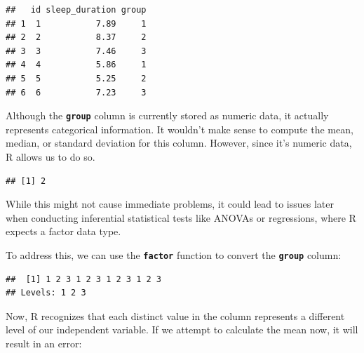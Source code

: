 \documentclass[
]{book}
\newenvironment{Shaded}{\begin{snugshade}}{\end{snugshade}}
\newcommand{\FunctionTok}[1]{\textcolor[rgb]{0.13,0.29,0.53}{\textbf{#1}}}
\newcommand{\NormalTok}[1]{#1}
\newcommand{\SpecialCharTok}[1]{\textcolor[rgb]{0.81,0.36,0.00}{\textbf{#1}}}
\begin{document}
\begin{verbatim}
##   id sleep_duration group
## 1  1           7.89     1
## 2  2           8.37     2
## 3  3           7.46     3
## 4  4           5.86     1
## 5  5           5.25     2
## 6  6           7.23     3
\end{verbatim}

Although the \textbf{\texttt{group}} column is currently stored as numeric data, it actually represents categorical information. It wouldn't make sense to compute the mean, median, or standard deviation for this column. However, since it's numeric data, R allows us to do so.

\begin{Shaded}
\end{Shaded}

\begin{verbatim}
## [1] 2
\end{verbatim}

While this might not cause immediate problems, it could lead to issues later when conducting inferential statistical tests like ANOVAs or regressions, where R expects a factor data type.

To address this, we can use the \textbf{\texttt{factor}} function to convert the \textbf{\texttt{group}} column:

\begin{Shaded}
\end{Shaded}

\begin{verbatim}
##  [1] 1 2 3 1 2 3 1 2 3 1 2 3
## Levels: 1 2 3
\end{verbatim}

Now, R recognizes that each distinct value in the column represents a different level of our independent variable. If we attempt to calculate the mean now, it will result in an error:

\begin{Shaded}
\end{Shaded}
\end{document}
